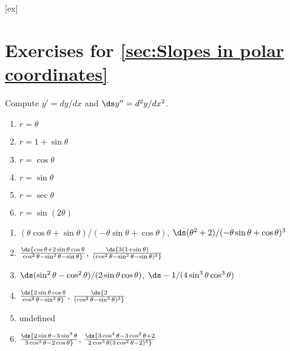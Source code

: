 [ex]
\section*{Exercises for \ref{sec:Slopes in polar coordinates}}

\begin{enumialphparenastyle}

\begin{ex}
\noindent Compute $y'=dy/dx$ and $\ds y''=d^2y/dx^2$.
\begin{multicols}{2}
\begin{enumerate}
	\item	$r=\theta$
	\item	$r=1+\sin\theta$
	\item	$r=\cos\theta$
	\item	$r=\sin\theta$
	\item	$r=\sec\theta$
	\item	$r=\sin(2\theta)$
\end{enumerate}
\end{multicols}
\begin{sol}
\begin{enumerate}
	\item	$(\theta\cos\theta+\sin\theta)/(-\theta\sin\theta+\cos\theta)$,
	$\ds (\theta^2+2)/(-\theta\sin\theta+\cos\theta)^3$
	\item	$\ds {\cos\theta+2\sin\theta\cos\theta\over
		\cos^2\theta-\sin^2\theta-\sin\theta}$,
	$\ds {3(1+\sin\theta)\over(\cos^2\theta-\sin^2\theta-\sin\theta)^3}$
	\item	$\ds (\sin^2\theta-\cos^2\theta)/(2\sin\theta\cos\theta)$,
	$\ds -1/(4\sin^3\theta\cos^3\theta)$
	\item	$\ds {2\sin\theta\cos\theta\over\cos^2\theta-\sin^2\theta}$,
	$\ds {2\over(\cos^2\theta-\sin^2\theta)^3}$
	\item	undefined
	\item	$\ds {2\sin\theta-3\sin^3\theta\over3\cos^3\theta-2\cos\theta}$,
	$\ds {3\cos^4\theta-3\cos^2\theta+2\over2\cos^3\theta(3\cos^2\theta-2)^3}$
\end{enumerate}
\end{sol}
\end{ex}


\end{enumialphparenastyle}
